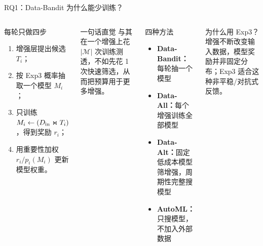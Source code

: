 \begin{frame}{RQ1：Data-Bandit 为什么能少训练？}
\begin{columns}[T,onlytextwidth]
\begin{block}{每轮只做四步}
\begin{enumerate}
  \item 增强层提出候选 $T_i$；
  \item 按 Exp3 概率抽取一个模型 $M_i$；
  \item 只训练 $M_i\leftarrow(D_{\rm in}\Join T_i)$，得到奖励 $r_i$；
  \item 用重要性加权 $r_i/p_i(M_i)$ 更新模型权重。
\end{enumerate}
\end{block}
\begin{exampleblock}{一句话直觉}
与其在一个增强上花 $|\mathcal M|$ 次训练测透，不如先花 1 次快速筛选，从而把预算用于更多增强。
\end{exampleblock}
\begin{block}{四种方法}
\small
\begin{itemize}
  \item \textbf{Data-Bandit：}每轮抽一个模型
  \item \textbf{Data-All：}每个增强训练全部模型
  \item \textbf{Data-Alt：}固定低成本模型筛增强，周期性完整搜模型
  \item \textbf{AutoML：}只搜模型，不加入外部数据
\end{itemize}
\end{block}
\begin{alertblock}{为什么用 Exp3？}
增强不断改变输入数据，模型奖励并非固定分布；Exp3 适合这种非平稳/对抗式反馈。
\end{alertblock}
\end{columns}
\end{frame}

